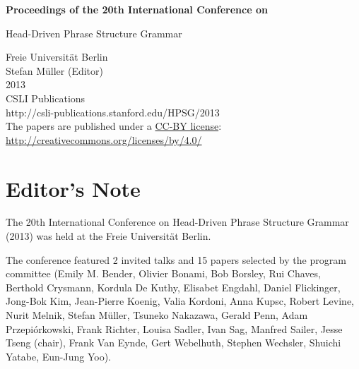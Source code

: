 \documentclass[11pt,a4paper,fleqn]{article}
\begin{document}
\begin{center}
{\Large
                {\bfseries Proceedings of the 20th International Conference on\par Head-Driven Phrase Structure Grammar\par}

                \vspace{8ex}

                     Freie Universit\"{a}t Berlin\\[\baselineskip]

                        Stefan M{\"u}ller (Editor)\\[\baselineskip]

                                2013\\[\baselineskip]

                          CSLI Publications\\[\baselineskip]

              http://csli-publications.stanford.edu/HPSG/2013 \\[4\baselineskip]

The papers are published under a \href{http://creativecommons.org/licenses/by/4.0/}{CC-BY license}:\\[3pt]
\href{http://creativecommons.org/licenses/by/4.0/}{http://creativecommons.org/licenses/by/4.0/}
}
\end{center}
\newpage
\tableofcontents

\newpage

\section{Editor's Note}
The 20th International Conference on Head-Driven Phrase Structure Grammar (2013) was held at the
Freie Universität Berlin.

The conference featured 2 invited talks and 15 papers selected by the program committee 
(Emily M. Bender,
    Olivier Bonami,
    Bob Borsley,
    Rui Chaves,
    Berthold Crysmann,
    Kordula De Kuthy,
    Elisabet Engdahl,
    Daniel Flickinger,
    Jong-Bok Kim,
    Jean-Pierre Koenig,
    Valia Kordoni,
    Anna Kupsc,
    Robert Levine,
    Nurit Melnik,
    Stefan Müller,
    Tsuneko Nakazawa,
    Gerald Penn,
    Adam Przepiórkowski,
    Frank Richter,
    Louisa Sadler,
    Ivan Sag,
    Manfred Sailer,
    Jesse Tseng (chair),
    Frank Van Eynde,
    Gert Webelhuth,
    Stephen Wechsler,
    Shuichi Yatabe,
    Eun-Jung Yoo).
\end{document}
